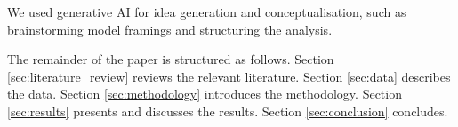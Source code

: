 We used generative AI \parencite{anthropic2026} for idea generation and conceptualisation, such as brainstorming model framings and structuring the analysis.

The remainder of the paper is structured as follows. Section \ref{sec:literature_review} reviews the relevant literature. Section \ref{sec:data} describes the data. Section \ref{sec:methodology} introduces the methodology. Section \ref{sec:results} presents and discusses the results. Section \ref{sec:conclusion} concludes.